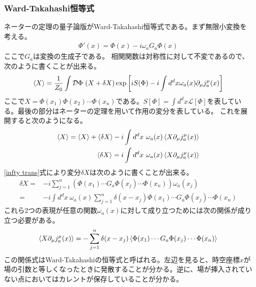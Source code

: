 \documentclass[11pt, dvipdfmx]{article}
\numberwithin{equation}{section}
\newcommand{\blankline}{\par\vspace{\baselineskip}} %
\begin{document}
\subsubsection{Ward-Takahashi恒等式}
ネーターの定理の量子論版がWard-Takahashi恒等式である。まず無限小変換を考える。
\begin{align}
    \Phi'(x)=\Phi(x)-i\omega_a G_a\Phi(x)\label{infty trans}
\end{align}
ここで$G_a$は変換の生成子である。
相関関数は対称性に対して不変であるので、次のように書くことが出来る。
\begin{align}
    \ev{X}=\frac{1}{Z_0}\int \mathcal{D}\Phi \ (X+\delta X) \exp\qty[iS(\Phi)-i\int d^dx \omega_a(x)\partial_\mu j_a^\mu (x)]%
\end{align}
ここで$X=\Phi(x_1)\Phi(x_2)\cdots \Phi(x_n)$である。$S[\Phi]=\int d^dx \mathcal{L}[\Phi]$を表している。最後の部分はネーターの定理を用いて作用の変分を表している。
これを展開すると次のようになる。
\begin{align}
   \ev{X}=\ev{X}+\ev{\delta X}-i\int d^dx \ \omega_a(x)\ev{X\partial_\mu j_a^\mu (x)}\\
\ev{\delta X}=i\int d^dx \ \omega_a(x)\ev{X\partial_\mu j_a^\mu (x)}
\end{align}
\eqref{infty trans}式により変分$\delta X$は次のように書くことが出来る。
\begin{align}
    \delta X=&-i\sum_{j=1}^n (\Phi(x_1)\cdots G_a\Phi(x_j)\cdots \Phi(x_n))\omega_a(x_j)\\
    =&-i\int d^dx \ \omega_a(x)\sum_{j=1}^n \delta(x-x_j)\Phi(x_1)\cdots G_a \Phi(x_j)\cdots \Phi(x_n)
\end{align}
これら2つの表現が任意の関数$\omega_a(x)$に対して成り立つためには次の関係が成り立つ必要がある。
\begin{align}
    \ev{X\partial_\mu j_a^\mu (x)}=-\sum_{j=1}^n \delta(x-x_j)\ev{\Phi(x_1)\cdots G_a \Phi(x_j)\cdots \Phi(x_n)}\label{Ward takahashi}
\end{align}
この関係式はWard-Takahashiの恒等式と呼ばれる。左辺を見ると、時空座標$x$が場の引数と等しくなったときに発散することが分かる。逆に、場が挿入されていない点においてはカレントが保存していることが分かる。
\blankline
\end{document}

